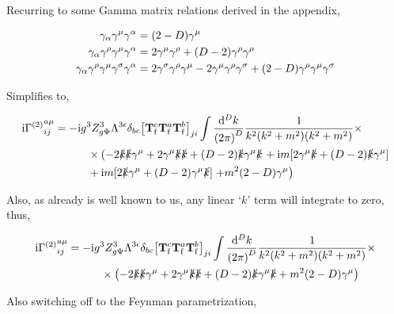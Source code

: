 Recurring to some Gamma matrix relations derived in the appendix,

\begin{align}
    \gamma_\alpha\gamma^\mu\gamma^\alpha&=\qty(2-D)\gamma^\mu\nonumber\\
    \gamma_\alpha\gamma^\rho\gamma^\mu\gamma^\alpha&=2\gamma^\mu\gamma^\rho
    +\qty(D-2)\gamma^\rho\gamma^\mu\nonumber\\
    \gamma_\alpha\gamma^\rho\gamma^\mu\gamma^\sigma\gamma^\alpha&=
    2\gamma^\sigma\gamma^\rho\gamma^\mu-2\gamma^\mu\gamma^\rho\gamma^\sigma
    +\qty(2-D)\gamma^\rho\gamma^\mu\gamma^\sigma\nonumber
\end{align}

Simplifies to,

\begin{align}
    \textnormal{i}{\Gamma^{\qty(2)}}^{a\mu}_{ij}&=-\textnormal{i} g^3Z_{g\Psi}^3\Lambda^{3\epsilon}\delta_{bc}
    \qty[{\vb T^c_{\textnormal{f}}}{\vb T^a_{\textnormal{f}}}{\vb T^b_{\textnormal{f}}}]_{ji}
    \int\frac{\dd[D]{k}}{\qty(2\pi)^D}\frac{1}{k^2\qty(k^2+m^2)\qty(k^2+m^2)}\times\nonumber\\
    &\quad\quad\quad\times\left(-2\slashed k\slashed k\gamma^\mu
    +2\gamma^\mu\slashed k\slashed k
    +\qty(D-2)\slashed k\gamma^\mu\slashed k\right.+\textnormal{i} m\qty[2\gamma^\mu\slashed k+\qty(D-2)\slashed k\gamma^\mu]\nonumber\\
    &\quad\quad\quad+\textnormal{i} m\qty[2\slashed k\gamma^\mu+\qty(D-2)\gamma^\mu\slashed k]\left.+m^2\qty(2-D)\gamma^\mu\right)\nonumber
\end{align}

Also, as already is well known to us, any linear `$k$' term will integrate to zero, thus,

\begin{align}
    \textnormal{i}{\Gamma^{\qty(2)}}^{a\mu}_{ij}&=-\textnormal{i} g^3Z_{g\Psi}^3\Lambda^{3\epsilon}\delta_{bc}
    \qty[{\vb T^c_{\textnormal{f}}}{\vb T^a_{\textnormal{f}}}{\vb T^b_{\textnormal{f}}}]_{ji}
    \int\frac{\dd[D]{k}}{\qty(2\pi)^D}\frac{1}{k^2\qty(k^2+m^2)\qty(k^2+m^2)}\times\nonumber\\
    &\quad\quad\quad\times\qty(-2\slashed k\slashed k\gamma^\mu
    +2\gamma^\mu\slashed k\slashed k
    +\qty(D-2)\slashed k\gamma^\mu\slashed k+m^2\qty(2-D)\gamma^\mu)\nonumber\\
\end{align}

Also switching off to the Feynman parametrization,

